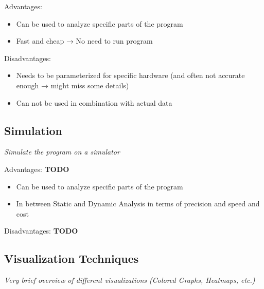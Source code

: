 Advantages:
\begin{itemize}
  \item Can be used to analyze specific parts of the program
  \item Fast and cheap → No need to run program
\end{itemize}
Disadvantages:
\begin{itemize}
  \item Needs to be parameterized for specific hardware (and often not accurate enough → might miss some details)
  \item Can not be used in combination with actual data
\end{itemize}

\subsection{Simulation}\label{sec:simulation}
\textit{Simulate the program on a simulator}
\cite{schaad2022boosting,hammer2017kerncraft,choudhury2011abstract,iakymchuk2012modeling}

Advantages:
\textbf{TODO}
\begin{itemize}
  \item Can be used to analyze specific parts of the program
  \item In between Static and Dynamic Analysis in terms of precision and speed and cost
\end{itemize}
Disadvantages:
\textbf{TODO}

\subsection{Visualization Techniques}\label{sec:visualization}
\textit{Very brief overview of different visualizations (Colored Graphs, Heatmaps, etc.)}
